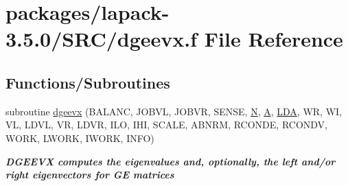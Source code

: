 \hypertarget{dgeevx_8f}{}\section{packages/lapack-\/3.5.0/\+S\+R\+C/dgeevx.f File Reference}
\label{dgeevx_8f}
\subsection*{Functions/\+Subroutines}
\begin{DoxyCompactItemize}
\item 
subroutine \hyperlink{group__doubleGEeigen_ga4e35e1d4e9b63ba9eef4ba8aff3debae}{dgeevx} (B\+A\+L\+A\+N\+C, J\+O\+B\+V\+L, J\+O\+B\+V\+R, S\+E\+N\+S\+E, \hyperlink{polmisc_8c_a0240ac851181b84ac374872dc5434ee4}{N}, \hyperlink{classA}{A}, \hyperlink{example__user_8c_ae946da542ce0db94dced19b2ecefd1aa}{L\+D\+A}, W\+R, W\+I, V\+L, L\+D\+V\+L, V\+R, L\+D\+V\+R, I\+L\+O, I\+H\+I, S\+C\+A\+L\+E, A\+B\+N\+R\+M, R\+C\+O\+N\+D\+E, R\+C\+O\+N\+D\+V, W\+O\+R\+K, L\+W\+O\+R\+K, I\+W\+O\+R\+K, I\+N\+F\+O)
\begin{DoxyCompactList}\small\item\em {\bfseries  D\+G\+E\+E\+V\+X computes the eigenvalues and, optionally, the left and/or right eigenvectors for G\+E matrices} \end{DoxyCompactList}\end{DoxyCompactItemize}
